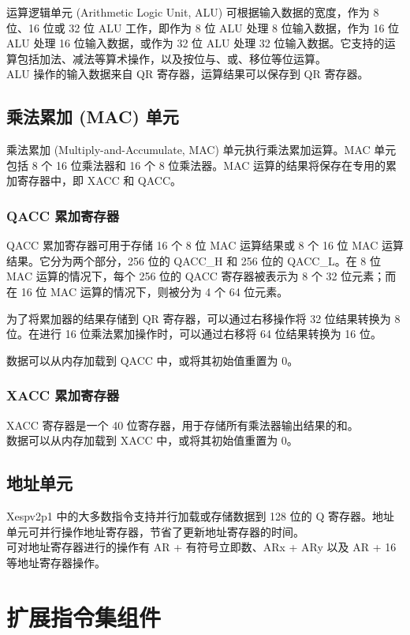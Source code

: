 \documentclass[main\_\_CN.tex]{subfiles}
\begin{document}
运算逻辑单元 (Arithmetic Logic Unit, ALU) 可根据输入数据的宽度，作为 8 位、16 位或 32 位 ALU 工作，即作为 8 位 ALU 处理 8 位输入数据，作为 16 位 ALU 处理 16 位输入数据，或作为 32 位 ALU 处理 32 位输入数据。它支持的运算包括加法、减法等算术操作，以及按位与、或、移位等位运算。\\
ALU 操作的输入数据来自 QR 寄存器，运算结果可以保存到 QR 寄存器。

\subsection{乘法累加 (MAC) 单元}
乘法累加 (Multiply-and-Accumulate, MAC) 单元执行乘法累加运算。MAC 单元包括 8 个 16 位乘法器和 16 个 8 位乘法器。MAC 运算的结果将保存在专用的累加寄存器中，即 XACC 和 QACC。

\subsubsection{QACC 累加寄存器}

QACC 累加寄存器可用于存储 16 个 8 位 MAC 运算结果或 8 个 16 位 MAC 运算结果。它分为两个部分，256 位的 QACC\_H 和 256 位的 QACC\_L。在 8 位 MAC 运算的情况下，每个 256 位的 QACC 寄存器被表示为 8 个 32 位元素；而在 16 位 MAC 运算的情况下，则被分为 4 个 64 位元素。

为了将累加器的结果存储到 QR 寄存器，可以通过右移操作将 32 位结果转换为 8 位。在进行 16 位乘法累加操作时，可以通过右移将 64 位结果转换为 16 位。

数据可以从内存加载到 QACC 中，或将其初始值重置为 0。

\subsubsection{XACC 累加寄存器}

XACC 寄存器是一个 40 位寄存器，用于存储所有乘法器输出结果的和。\\
数据可以从内存加载到 XACC 中，或将其初始值重置为 0。

\subsection{地址单元}

Xespv2p1 中的大多数指令支持并行加载或存储数据到 128 位的 Q 寄存器。地址单元可并行操作地址寄存器，节省了更新地址寄存器的时间。\\
可对地址寄存器进行的操作有 AR + 有符号立即数、ARx + ARy 以及 AR + 16 等地址寄存器操作。


\section{扩展指令集组件}
\end{document}
